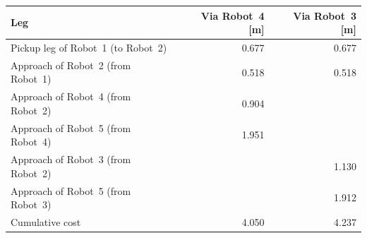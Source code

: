 \begin{tabular}{@{}lrr@{}}
\toprule
        \textbf{Leg} & \textbf{Via Robot~4 [m]} & \textbf{Via Robot~3 [m]} \\
\midrule
        Pickup leg of Robot~1 (to Robot~2) & 0.677 & 0.677 \\
        Approach of Robot~2 (from Robot~1) & 0.518 & 0.518 \\
        Approach of Robot~4 (from Robot~2) & 0.904 &  \\
        Approach of Robot~5 (from Robot~4) & 1.951 &  \\
        Approach of Robot~3 (from Robot~2) &  & 1.130 \\
        Approach of Robot~5 (from Robot~3) &  & 1.912 \\
\midrule
        Cumulative cost & 4.050 & 4.237 \\
\bottomrule
\end{tabular}
